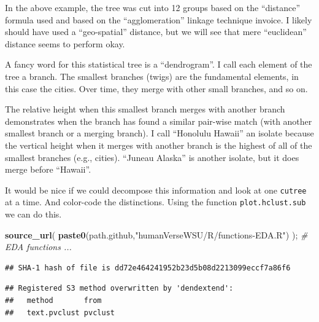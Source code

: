\documentclass[
]{article}
\newenvironment{Shaded}{\begin{snugshade}}{\end{snugshade}}
\newcommand{\CommentTok}[1]{\textcolor[rgb]{0.56,0.35,0.01}{\textit{#1}}}
\newcommand{\DataTypeTok}[1]{\textcolor[rgb]{0.13,0.29,0.53}{#1}}
\newcommand{\DecValTok}[1]{\textcolor[rgb]{0.00,0.00,0.81}{#1}}
\newcommand{\KeywordTok}[1]{\textcolor[rgb]{0.13,0.29,0.53}{\textbf{#1}}}
\newcommand{\NormalTok}[1]{#1}
\newcommand{\OperatorTok}[1]{\textcolor[rgb]{0.81,0.36,0.00}{\textbf{#1}}}
\newcommand{\StringTok}[1]{\textcolor[rgb]{0.31,0.60,0.02}{#1}}
\begin{document}
In the above example, the tree was cut into 12 groups based on the
``distance'' formula used and based on the ``agglomeration'' linkage
technique invoice. I likely should have used a ``geo-spatial'' distance,
but we will see that mere ``euclidean'' distance seems to perform okay.

A fancy word for this statistical tree is a ``dendrogram''. I call each
element of the tree a branch. The smallest branches (twigs) are the
fundamental elements, in this case the cities. Over time, they merge
with other small branches, and so on.

The relative height when this smallest branch merges with another branch
demonstrates when the branch has found a similar pair-wise match (with
another smallest branch or a merging branch). I call ``Honolulu Hawaii''
an isolate because the vertical height when it merges with another
branch is the highest of all of the smallest branches (e.g., cities).
``Juneau Alaska'' is another isolate, but it does merge before
``Hawaii''.

It would be nice if we could decompose this information and look at one
\texttt{cutree} at a time. And color-code the distinctions. Using the
function \texttt{plot.hclust.sub} we can do this.

\begin{Shaded}
\begin{Highlighting}[]
\KeywordTok{source\_url}\NormalTok{( }\KeywordTok{paste0}\NormalTok{(path.github,}\StringTok{"humanVerseWSU/R/functions{-}EDA.R"}\NormalTok{) );  }\CommentTok{\# EDA functions ...}
\end{Highlighting}
\end{Shaded}

\begin{verbatim}
## SHA-1 hash of file is dd72e464241952b23d5b08d2213099eccf7a86f6
\end{verbatim}

\begin{Shaded}
\end{Shaded}

\begin{verbatim}
## Registered S3 method overwritten by 'dendextend':
##   method       from   
##   text.pvclust pvclust
\end{verbatim}
\end{document}
